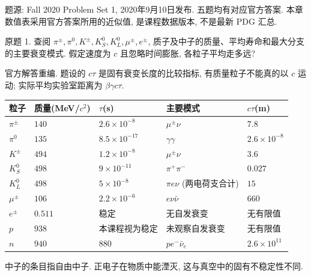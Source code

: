 题源: Fall 2020 Problem Set 1, 2020年9月10日发布. 五题均有对应官方答案. 本章数值表采用官方答案所用的近似值, 是课程数据版本, 不是最新 PDG 汇总.

\begin{exercise}\label{ex:8701-1-1}
原题 1. 查阅 $\pi^\pm,\pi^0,K^\pm,K_S^0,K_L^0,\mu^\pm,e^\pm$, 质子及中子的质量、平均寿命和最大分支的主要衰变模式. 假定速度为 $c$ 且忽略时间膨胀, 各粒子平均走多远?
\end{exercise}
\begin{solution}
官方解答重编. 题设的 $c\tau$ 是固有衰变长度的比较指标, 有质量粒子不能真的以 $c$ 运动; 实际平均实验室距离为 $\beta\gamma c\tau$.
\begin{center}\begin{tabular}{lllll}\toprule
粒子&质量(MeV/$c^2$)&$\tau$(s)&主要模式&$c\tau$(m)\\\midrule
$\pi^\pm$&$140$&$2.6\times10^{-8}$&$\mu^\pm\nu$&$7.8$\\
$\pi^0$&$135$&$8.5\times10^{-17}$&$\gamma\gamma$&$2.6\times10^{-8}$\\
$K^\pm$&$494$&$1.2\times10^{-8}$&$\mu^\pm\nu$&$3.6$\\
$K_S^0$&$498$&$9\times10^{-11}$&$\pi^+\pi^-$&$0.027$\\
$K_L^0$&$498$&$5\times10^{-8}$&$\pi e\nu$ (两电荷支合计)&$15$\\
$\mu^\pm$&$106$&$2.2\times10^{-6}$&$e\nu\bar\nu$&$660$\\
$e^\pm$&$0.511$&稳定&无自发衰变&无有限值\\
$p$&$938$&本课程视为稳定&未观察自发衰变&无有限值\\
$n$&$940$&$880$&$pe^-\bar\nu_e$&$2.6\times10^{11}$\\\bottomrule
\end{tabular}\end{center}
中子的条目指自由中子. 正电子在物质中能湮灭, 这与真空中的固有不稳定性不同.
\end{solution}

